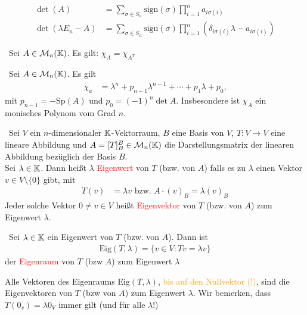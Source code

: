 \begin{remark}\,
\begin{align*}
    \det(A) &= \sum_{\sigma\in S_n} \text{sign}(\sigma) \prod_{i=1}^{n} a_{i\sigma(i)}\\
    \det(\lambda E_n-A) &= \sum_{\sigma\in S_n} \text{sign}(\sigma) \prod_{i=1}^{n} (\delta_{i\sigma(i)}\lambda-a_{i\sigma(i)})
\end{align*}
\end{remark}

\begin{lemma}\,
Sei $A\in\mathcal{M}_n(\mathbb{K})$. Es gilt: $\chi_A=\chi_{A^T}$
\end{lemma}

\begin{lemma}\,
Sei $A\in\mathcal{M}_n(\mathbb{K})$. Es gilt
\begin{align*}
    \chi_a&=\lambda^n+p_{n-1}\lambda^{n-1}+\cdots+p_1\lambda+p_0\text{,}
\end{align*}
mit $p_{n-1}=-\text{Sp}(A)$ und $p_0=(-1)^n\det A$.
Insbesondere ist $\chi_A$ ein monisches Polynom vom Grad $n$.
\end{lemma}

\begin{definition}\,
Sei $V$ ein $n$-dimensionaler $\mathbb{K}$-Vektorraum, $B$ eine Basis von $V$, $T:V\to V$ eine lineare Abbildung und $A=[T]_B^B\in\mathcal{M}_n(\mathbb{K})$ die Darstellungsmatrix der linearen Abbildung bezüglich der Basis $B$.\\
Sei $\lambda\in\mathbb{K}$.
Dann heißt $\lambda$ \textcolor{red}{Eigenwert} von $T$ (bzw. von $A$) falls es zu $\lambda$ einen Vektor $v\in V\setminus\{0\}$ gibt, mit
\begin{align*}
    T(v)&=\lambda v \text{  bzw.  } A\cdot(v)_B=\lambda(v)_B
\end{align*}
Jeder solche Vektor $0\neq v\in V$ heißt \textcolor{red}{Eigenvektor} von $T$ (bzw. von $A$) zum Eigenwert $\lambda$.
\end{definition}

\begin{definition}\,
Sei $\lambda\in\mathbb{K}$ ein Eigenwert von $T$ (bzw. von $A$). Dann ist
\begin{align*}
    \text{Eig}(T,\lambda)=\{v\in V:Tv=\lambda v\}
\end{align*}
der \textcolor{red}{Eigenraum} von $T$ (bzw $A$) zum Eigenwert $\lambda$
\end{definition}

\begin{remark}
Alle Vektoren des Eigenraums Eig$(T,\lambda)$, \textcolor{orange}{bis auf den Nullvektor (!)}, sind die Eigenvektoren von $T$ (bzw von $A$) zum Eigenwert $\lambda$.
Wir bemerken, dass $T(0_v)=\lambda0_V$ immer gilt (und für alle $\lambda!$)
\end{remark}

